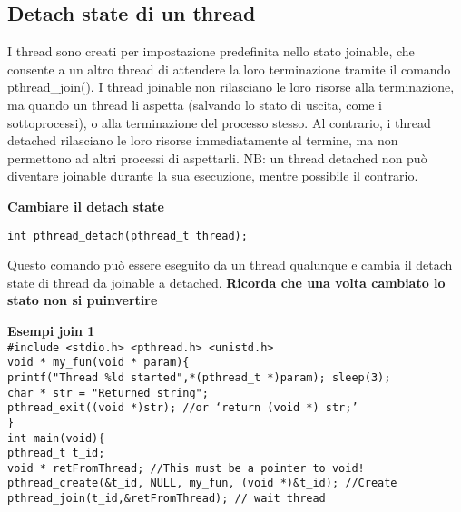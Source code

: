 \begin{flushleft}
  \subsection{Detach state di un thread}
  \begin{flushleft}
    I thread sono creati per impostazione predefinita nello stato joinable, che consente a 
    un altro thread di attendere la loro terminazione tramite il comando 
    pthread\_join(). I thread joinable non rilasciano le loro risorse alla terminazione, 
    ma quando un thread li aspetta (salvando lo stato di uscita, come i sottoprocessi), o 
    alla terminazione del processo stesso. Al contrario, i thread detached rilasciano le 
    loro risorse immediatamente al termine, ma non permettono ad altri processi di 
    aspettarli.
    NB: un thread detached non può diventare joinable durante la sua esecuzione, 
    mentre \ace possibile il contrario.
    \begin{flushleft}
      \textbf{Cambiare il detach state}
      \begin{flushleft}
        \texttt{int pthread\_detach(pthread\_t thread);}
      \end{flushleft}
      Questo comando può essere eseguito da un thread qualunque e cambia il detach state 
      di thread da joinable a detached. 
      \textbf{Ricorda che una volta cambiato lo stato non si pu\aco invertire}
    \end{flushleft}
  \end{flushleft}
  \begin{flushleft}
    \textbf{Esempi join 1}\\
    \texttt{\#include <stdio.h> <pthread.h> <unistd.h> \\
    void * my\_fun(void * param)\{ \\
    \halftab printf("Thread \%ld started\n",*(pthread\_t *)param); sleep(3);\\
    \halftab char * str = "Returned string";\\
    \halftab pthread\_exit((void *)str); //or ‘return (void *) str;’\\
    \}\\
    int main(void)\{ \\
    \halftab pthread\_t t\_id;\\
    \halftab void * retFromThread; //This must be a pointer to void!\\
    \halftab pthread\_create(\&t\_id, NULL, my\_fun, (void *)\&t\_id); //Create\\
    \halftab pthread\_join(t\_id,\&retFromThread); // wait thread\\
}
\end{flushleft}
\end{flushleft}
